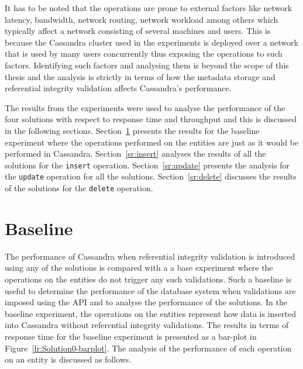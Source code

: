 It has to be noted that the operations are prone to  external factors like
network latency, bandwidth, network routing, network workload among others which
typically affect a network consisting of several machines and users. This is
because the Cassandra cluster used in the experiments is deployed over a
network that is used by many users concurrently thus exposing the operations to
such factors. Identifying such factors and analysing them is beyond the scope of
this thesis and the analysis is strictly in terms of how the metadata storage
and referential integrity validation affects Cassandra's performance.

 The results from the experiments were used to
analyse the performance of the four solutions with respect to  response
time and throughput and this is discussed in the following sections.
Section~\ref{sr:baseline} presents the results for the baseline experiment where 
the operations performed on the entities are just as it would be performed in
Cassandra. Section~\ref{sr:insert} analyses the results of all the solutions
for the \texttt{insert} operation. Section~\ref{sr:update} presents the analysis
for the \texttt{update} operation for all the solutions. Section~\ref{sr:delete}
discusses the results of the solutions for the \texttt{delete} operation. 


\section{Baseline}\label{sr:baseline}
The performance of Cassandra when referential
integrity validation is introduced using any of the solutions is compared with a
a base experiment where the operations on the entities do not trigger any
such validations. Such a baseline is useful to determine the
performance of the database system when validations are imposed using the
\ac{API} and to analyse the performance of the solutions.
In the baseline experiment, the operations on the entities represent how
data is inserted into Cassandra without referential integrity validations. The
results in terms of response time for the baseline experiment is presented as
a bar-plot in Figure~\ref{fr:Solution0-barplot}. The analysis of
the performance of each operation on an entity is discussed as follows.

	

